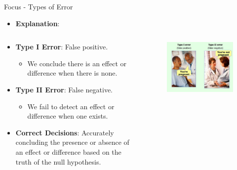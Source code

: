 \documentclass[
  ignorenonframetext,
]{beamer}
\providecommand{\tightlist}{%
  \setlength{\itemsep}{0pt}\setlength{\parskip}{0pt}}
\begin{document}
\begin{frame}{Focus - Types of Error}
\label{focus---types-of-error-3}
\begin{itemize}
\tightlist
\item
  \textbf{Explanation}:
\end{itemize}

\begin{columns}[T]
\begin{column}{0.5\textwidth}
\begin{itemize}
\tightlist
\item
  \textbf{Type I Error}: False positive.

  \begin{itemize}
  \tightlist
  \item
    We conclude there is an effect or difference when there is none.
  \end{itemize}
\end{itemize}

\begin{itemize}
\tightlist
\item
  \textbf{Type II Error}: False negative.

  \begin{itemize}
  \tightlist
  \item
    We fail to detect an effect or difference when one exists.
  \end{itemize}
\end{itemize}

\begin{itemize}
\tightlist
\item
  \textbf{Correct Decisions}: Accurately concluding the presence or
  absence of an effect or difference based on the truth of the null
  hypothesis.
\end{itemize}
\end{column}

\begin{column}{0.5\textwidth}
\begin{figure}

{\centering \includegraphics[width=0.8\linewidth]{figs/pregnant} 

}

\end{figure}
\end{column}
\end{columns}
\end{frame}
\end{document}
